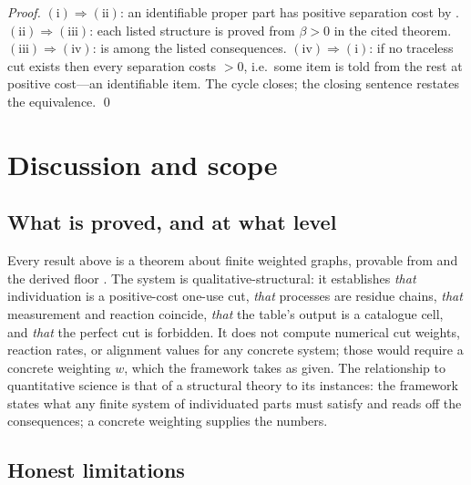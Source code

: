 \documentclass[11pt,a4paper]{article}
\theoremstyle{thmstyle}
\theoremstyle{definition}
\theoremstyle{remark}
\newcommand{\wt}{w}
\newcommand{\flo}{\beta}                 %
\begin{document}
\begin{proof}
$(\mathrm{i})\Rightarrow(\mathrm{ii})$: an identifiable proper part has
positive separation cost by .
$(\mathrm{ii})\Rightarrow(\mathrm{iii})$: each listed structure is proved
from $\flo>0$ in the cited theorem.
$(\mathrm{iii})\Rightarrow(\mathrm{iv})$:  is among the
listed consequences. $(\mathrm{iv})\Rightarrow(\mathrm{i})$: if no traceless
cut exists then every separation costs $>0$, i.e.\ some item is told from
the rest at positive cost---an identifiable item. The cycle closes; the
closing sentence restates the equivalence. \qed
\end{proof}

\section{Discussion and scope}
\label{sec:discussion}

\subsection{What is proved, and at what level}

Every result above is a theorem about finite weighted graphs, provable from
 and the derived floor . The system is
qualitative-structural: it establishes \emph{that} individuation is a
positive-cost one-use cut, \emph{that} processes are residue chains,
\emph{that} measurement and reaction coincide, \emph{that} the table's
output is a catalogue cell, and \emph{that} the perfect cut is forbidden.
It does not compute numerical cut weights, reaction rates, or alignment
values for any concrete system; those would require a concrete weighting
$\wt$, which the framework takes as given. The relationship to quantitative
science is that of a structural theory to its instances: the framework
states what any finite system of individuated parts must satisfy and reads
off the consequences; a concrete weighting supplies the numbers.

\subsection{Honest limitations}
\end{document}
